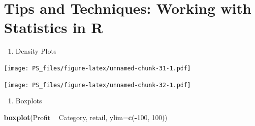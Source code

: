 \documentclass[]{article}
\newenvironment{Shaded}{\begin{snugshade}}{\end{snugshade}}
\newcommand{\DataTypeTok}[1]{\textcolor[rgb]{0.13,0.29,0.53}{#1}}
\newcommand{\DecValTok}[1]{\textcolor[rgb]{0.00,0.00,0.81}{#1}}
\newcommand{\KeywordTok}[1]{\textcolor[rgb]{0.13,0.29,0.53}{\textbf{#1}}}
\newcommand{\NormalTok}[1]{#1}
\newcommand{\OperatorTok}[1]{\textcolor[rgb]{0.81,0.36,0.00}{\textbf{#1}}}
\newcommand{\StringTok}[1]{\textcolor[rgb]{0.31,0.60,0.02}{#1}}
\providecommand{\tightlist}{%
  \setlength{\itemsep}{0pt}\setlength{\parskip}{0pt}}
\begin{document}
\hypertarget{tips-and-techniques-working-with-statistics-in-r}{%
\section{Tips and Techniques: Working with Statistics in
R}\label{tips-and-techniques-working-with-statistics-in-r}}

\begin{enumerate}
\def\labelenumi{\arabic{enumi}.}
\tightlist
\item
  Density Plots
\end{enumerate}

\begin{Shaded}
\end{Shaded}

\texttt{[image: PS\_files/figure-latex/unnamed-chunk-31-1.pdf]}

\begin{Shaded}
\end{Shaded}

\texttt{[image: PS\_files/figure-latex/unnamed-chunk-32-1.pdf]}

\begin{enumerate}
\def\labelenumi{\arabic{enumi}.}
\setcounter{enumi}{1}
\tightlist
\item
  Boxplots
\end{enumerate}

\begin{Shaded}
\begin{Highlighting}[]
\KeywordTok{boxplot}\NormalTok{(Profit }\OperatorTok{~}\StringTok{ }\NormalTok{Category, retail, }\DataTypeTok{ylim=}\KeywordTok{c}\NormalTok{(}\OperatorTok{-}\DecValTok{100}\NormalTok{, }\DecValTok{100}\NormalTok{))}
\end{Highlighting}
\end{Shaded}
\end{document}
